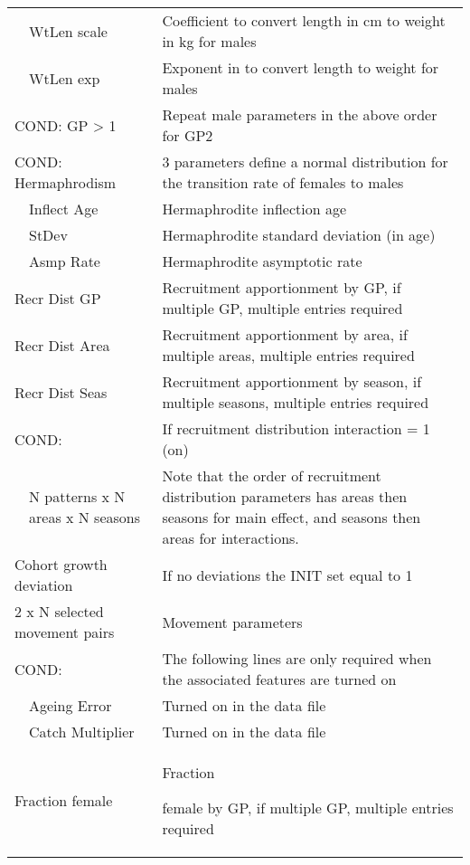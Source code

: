 \begin{center}
\begin{longtable}{p{1cm} p{2.5cm} p{10cm}}
		\hline
		& WtLen scale & Coefficient to convert length in cm to weight in kg for males\\
	    & WtLen exp & Exponent in to convert length to weight for males\\
		\hline
		\multicolumn{2}{l}{COND: GP > 1} & Repeat male parameters in the above order for GP2\\
		\hline
		\multicolumn{2}{l}{COND: Hermaphrodism} & 3 parameters define a normal distribution for the transition rate of females to males\\
		& Inflect Age & Hermaphrodite inflection age\\
		& StDev & Hermaphrodite standard deviation (in age) \\
		& Asmp Rate & Hermaphrodite asymptotic rate\\
		\hline
		\multicolumn{2}{l}{Recr Dist GP} & Recruitment apportionment by GP, if multiple GP, multiple entries required\\
		\multicolumn{2}{l}{Recr Dist Area} & Recruitment apportionment by area, if multiple areas, multiple entries required\\
		\multicolumn{2}{l}{Recr Dist Seas} & Recruitment apportionment by season, if multiple seasons, multiple entries required\\
		\hline
		\multicolumn{2}{l}{COND:} & If recruitment distribution interaction = 1 (on)\\
		& N patterns x N areas x N seasons & Note that the order of recruitment distribution parameters has areas then seasons for main effect, and seasons then areas for interactions.\\
		\hline
		\multicolumn{2}{l}{Cohort growth deviation} & If no deviations the INIT set equal to 1\\
		\multicolumn{2}{l}{2 x N selected movement pairs} & Movement parameters\\
		\hline
		\multicolumn{2}{l}{COND:} & The following lines are only required when the associated features are turned on\\
		& Ageing Error & Turned on in the data file\\
		& Catch Multiplier & Turned on in the data file\\
		\hline
		\multicolumn{2}{l}{Fraction female} & \hypertarget{SexRatio}{Fraction} female by GP, if multiple GP, multiple entries required\\
		\hline
	\end{longtable}
\end{center}



